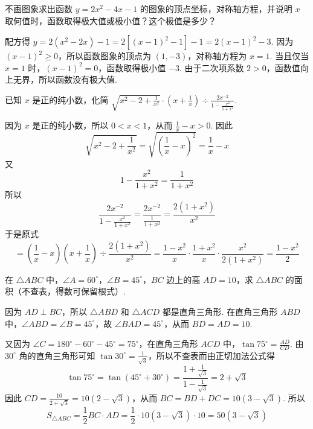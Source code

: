 \begin{problem}
不画图象求出函数 \(y=2x^2-4x-1\) 的图象的顶点坐标，对称轴方程，并说明 \(x\) 取何值时，函数取得极大值或极小值？这个极值是多少？
\end{problem}

\begin{solution}
配方得 \(y=2\left(x^2-2x\right)-1=2\left[\left(x-1\right)^2-1\right]-1=2\left(x-1\right)^2-3\). 因为 \(\left(x-1\right)^2\geqslant0\)，所以函数图象的顶点为 \(\left(1,-3\right)\)，对称轴方程为 \(x=1\). 当且仅当 \(x=1\) 时，\(\left(x-1\right)^2=0\)，函数取得极小值 \(-3\). 由于二次项系数 \(2>0\)，函数值向上无界，所以函数没有极大值.
\end{solution}

\begin{problem}
已知 \(x\) 是正的纯小数，化简
\(\sqrt{x^2-2+\frac{1}{x^2}} \cdot \left(x+\frac{1}{x}\right) \div \frac{2x^{-2}}{1-\frac{x^2}{1+x^2}}\).
\end{problem}

\begin{solution}
因为 \(x\) 是正的纯小数，所以 \(0<x<1\)，从而 \(\frac{1}{x}-x>0\). 因此
\[
\sqrt{x^2-2+\frac{1}{x^2}}=\sqrt{\left(\frac{1}{x}-x\right)^2}=\frac{1}{x}-x
\]
又
\[
1-\frac{x^2}{1+x^2}=\frac{1}{1+x^2}
\]
所以
\[
\frac{2x^{-2}}{1-\frac{x^2}{1+x^2}}=\frac{2x^{-2}}{\frac{1}{1+x^2}}=\frac{2\left(1+x^2\right)}{x^2}
\]
于是原式
\[
=\left(\frac{1}{x}-x\right)\left(x+\frac{1}{x}\right)\div\frac{2\left(1+x^2\right)}{x^2}
=\frac{1-x^2}{x}\cdot\frac{1+x^2}{x}\cdot\frac{x^2}{2\left(1+x^2\right)}
=\frac{1-x^2}{2}
\]
\end{solution}

\begin{problem}
在 \(\triangle ABC\) 中，\(\angle A=60^\circ\)，\(\angle B=45^\circ\)，\(BC\) 边上的高 \(AD=10\)，求 \(\triangle ABC\) 的面积（不查表，得数可保留根式）.
\end{problem}

\begin{solution}
因为 \(AD\perp BC\)，所以 \(\triangle ABD\) 和 \(\triangle ACD\) 都是直角三角形. 在直角三角形 \(ABD\) 中，\(\angle ABD=\angle B=45^\circ\)，故 \(\angle BAD=45^\circ\)，从而 \(BD=AD=10\).

又因为 \(\angle C=180^\circ-60^\circ-45^\circ=75^\circ\)，在直角三角形 \(ACD\) 中，\(\tan75^\circ=\frac{AD}{CD}\). 由 \(30^\circ\) 角的直角三角形可知 \(\tan30^\circ=\frac{1}{\sqrt{3}}\)，所以不查表而由正切加法公式得
\[
\tan75^\circ=\tan\left(45^\circ+30^\circ\right)=\frac{1+\frac{1}{\sqrt{3}}}{1-\frac{1}{\sqrt{3}}}=2+\sqrt{3}
\]
因此 \(CD=\frac{10}{2+\sqrt{3}}=10\left(2-\sqrt{3}\right)\)，从而 \(BC=BD+DC=10\left(3-\sqrt{3}\right)\). 所以
\[
S_{\triangle ABC}=\frac{1}{2}BC\cdot AD=\frac{1}{2}\cdot10\left(3-\sqrt{3}\right)\cdot10=50\left(3-\sqrt{3}\right)
\]
\end{solution}

